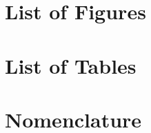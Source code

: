 \documentclass[conf]{new-aiaa}
\begin{document}

\newpage
\tableofcontents
\renewcommand{\thesection}{\arabic{section}}

\section{List of Figures}
\makeatletter
{}%
\makeatother

\section{List of Tables}
\makeatletter
{}%
\makeatother

\newpage


\section{Nomenclature}

\end{document}
